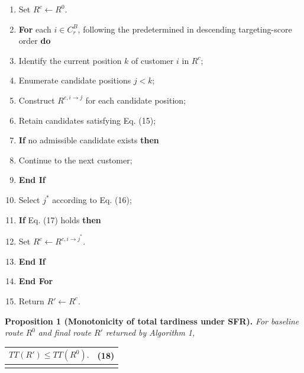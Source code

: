 \documentclass[
]{article}
\newcounter{none} %
\begin{document}
\begin{enumerate}
\def\labelenumi{\arabic{enumi}.}
\item
  Set \(R^{c} \leftarrow R^{0}\).
\item
  \textbf{For} each \(i \in C_{r}^{B}\), following the predetermined in
  descending targeting-score order \textbf{do}
\item
  Identify the current position \(k\) of customer \(i\) in \(R^{c}\);
\item
  Enumerate candidate positions \(j < k\);
\item
  Construct \(R^{c,i \rightarrow j}\) for each candidate position;
\item
  Retain candidates satisfying Eq. (15);
\item
  \textbf{If} no admissible candidate exists \textbf{then}
\item
  Continue to the next customer;
\item
  \textbf{End If}
\item
  Select \(j^{*}\) according to Eq. (16);
\item
  \textbf{If} Eq. (17) holds \textbf{then}
\item
  Set \(R^{c} \leftarrow R^{c,i \rightarrow j^{*}}\).
\item
  \textbf{End If}
\item
  \textbf{End For}
\item
  Return \(R' \leftarrow R^{c}\).
\end{enumerate}

\textbf{Proposition 1 (Monotonicity of total tardiness under SFR).}
\emph{For baseline route} \(R^{0}\) \emph{and final route} \(R'\)
\emph{returned by Algorithm 1,}

{\def\LTcaptype{none} %
\begin{longtable}[]{@{}
  >{\raggedright\arraybackslash}p{}
  >{\raggedright\arraybackslash}p{}@{}}
\toprule\noalign{}
\begin{minipage}[b]{\linewidth}\raggedright
\[TT\left( R' \right) \leq TT\left( R^{0} \right).\]
\end{minipage} & \begin{minipage}[b]{\linewidth}\raggedleft
(18)
\end{minipage} \\
\midrule\noalign{}
\endhead
\bottomrule\noalign{}
\endlastfoot
\end{longtable}
}
\end{document}

